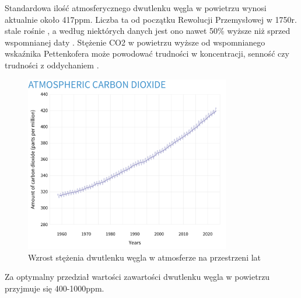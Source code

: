 Standardowa ilość atmosferycznego dwutlenku węgla w powietrzu wynosi aktualnie około 417ppm. 
Liczba ta od początku Rewolucji Przemysłowej w 1750r. stale rośnie \cite{atmo-co2-change}, a według niektórych danych jest 
ono nawet 50\% wyższe niż sprzed wspomnianej daty \cite{50-percent}. Stężenie CO2 w powietrzu wyższe od 
wspomnianego wskaźnika Pettenkofera może powodować trudności w koncentracji, senność czy 
trudności z oddychaniem \cite{pettenhofer}.

\begin{figure}[H]
    \centering
    \includegraphics[width=0.8\textwidth]{zdj/more-co2.png}
    \caption{Wzrost stężenia dwutlenku węgla w atmosferze na przestrzeni lat}
\end{figure}

Za optymalny przedział wartości zawartości dwutlenku węgla w powietrzu przyjmuje się 400-1000ppm.